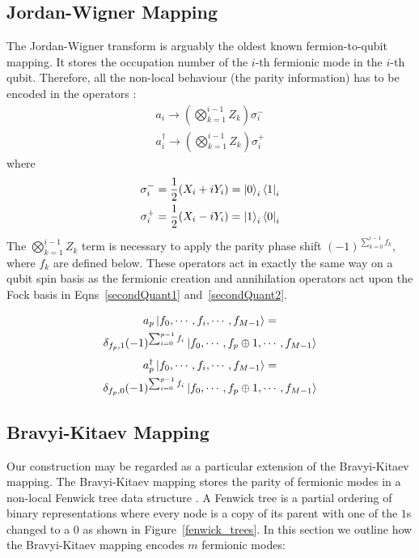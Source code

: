 \documentclass[pdftex,pra,aps,twocolumn,twoside]{revtex4-1}
\theoremstyle{plain}
\theoremstyle{note}
\newcommand\+{{\footnotesize \raisebox{0.3ex}{+}}}
\begin{document}
\subsection{Jordan-Wigner Mapping}
\label{section:jordan-wigner}
The Jordan-Wigner transform \cite{jordan1993paulische} is arguably the oldest known fermion-to-qubit mapping. It stores the occupation number of the $i$-th fermionic mode in the $i$-th qubit. Therefore, all the non-local behaviour (the parity information) has to be encoded in the operators \cite{chiew2021optimal}:
\begin{align}
        a_i \rightarrow \left( \bigotimes_{k=1}^{i-1} Z_k \right) \sigma_i^-\\
        a^{\dagger}_i \rightarrow \left( \bigotimes_{k=1}^{i-1} Z_k \right) \sigma_i^+
\end{align}
where
\begin{align}
        \sigma^-_i = \frac{1}{2} (X_i + i Y_i) = \ket{0}_i \bra{1}_i\\
        \sigma^+_i = \frac{1}{2} (X_i - i Y_i) = \ket{1}_i \bra{0}_i 
\end{align}
The $\bigotimes_{k=1}^{i-1} Z_k$ term is necessary to apply the parity phase shift $(-1)^{\sum_{k=0}^{i-1} f_k}$, where $f_k$ are defined below. These operators act in exactly the same way on a qubit spin basis as the fermionic creation and annihilation operators act upon the Fock basis in Eqns~\eqref{secondQuant1} and~\eqref{secondQuant2}.

\begin{multline}
    \label{secondQuant1}
    a_p \ket{f_0,\cdots, f_i, \cdots, f_{M-1}} =\\ \delta_{f_p, 1} (-1)^{\sum_{i=0}^{p-1} f_i} \ket{f_0,\cdots, f_p \oplus 1, \cdots, f_{M-1}}
    \end{multline}
\begin{multline}
    \label{secondQuant2}
    a_p^{\dagger} \ket{f_0,\cdots, f_i, \cdots, f_{M-1}} =\\ \delta_{f_p, 0} (-1)^{\sum_{i=0}^{p-1} f_i}
    \ket{f_0,\cdots, f_p \oplus 1, \cdots, f_{M-1}}
    \end{multline}
\subsection{Bravyi-Kitaev Mapping}
\label{section:bravyi-kitaev}
Our construction may be regarded as a particular extension of the Bravyi-Kitaev mapping. The Bravyi-Kitaev mapping stores the parity of fermionic modes in a non-local Fenwick tree data structure \cite{havlivcek2017operator}. A Fenwick tree \cite{fenwick1994new} is a partial ordering of binary representations where every node is a copy of its parent with one of the $1$s changed to a $0$ as shown in Figure~\ref{fenwick_trees}. In this section we outline how the Bravyi-Kitaev mapping encodes $m$ fermionic modes:
\end{document}
